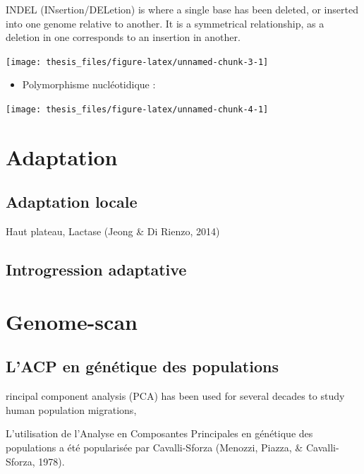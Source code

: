 \documentclass[12pt,twoside]{reedthesis}
\providecommand{\tightlist}{%
  \setlength{\itemsep}{0pt}\setlength{\parskip}{0pt}}
\begin{document}
  INDEL (INsertion/DELetion) is where a single base has been deleted, or
  inserted into one genome relative to another. It is a symmetrical
  relationship, as a deletion in one corresponds to an insertion in
  another.
  
  \begin{center}\texttt{[image: thesis\_files/figure-latex/unnamed-chunk-3-1]} \end{center}
  
  \begin{itemize}
  \tightlist
  \item
    Polymorphisme nucléotidique :
  \end{itemize}
  
  \begin{center}\texttt{[image: thesis\_files/figure-latex/unnamed-chunk-4-1]} \end{center}
  
  \section{Adaptation}\label{adaptation}
  
  \subsection{Adaptation locale}\label{adaptation-locale}
  
  Haut plateau, Lactase (Jeong \& Di Rienzo, 2014)
  
  \subsection{Introgression adaptative}\label{introgression-adaptative}
  
  \section{Genome-scan}\label{genome-scan}
  
  \subsection{L'ACP en génétique des
  populations}\label{lacp-en-genetique-des-populations}
  
  rincipal component analysis (PCA) has been used for several decades to
  study human population migrations,
  
  L'utilisation de l'Analyse en Composantes Principales en génétique des
  populations a été popularisée par Cavalli-Sforza (Menozzi, Piazza, \&
  Cavalli-Sforza, 1978).
  
\end{document}
